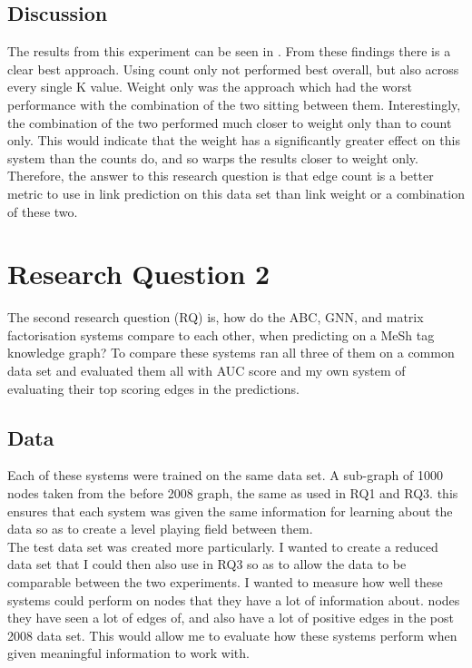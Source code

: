 \documentclass{l4proj}
\begin{document}
\subsection{Discussion}

The results from this experiment can be seen in . From these findings there is a clear best approach. Using count only not performed best overall, but also across every single K value. Weight only was the approach which had the worst performance with the combination of the two sitting between them. Interestingly, the combination of the two performed much closer to weight only than to count only. This would indicate that the weight has a significantly greater effect on this system than the counts do, and so warps the results closer to weight only. \\ 

Therefore, the answer to this research question is that edge count is a better metric to use in link prediction on this data set than link weight or a combination of these two. \\

\section{Research Question 2}

The second research question (RQ) is, how do the ABC, GNN, and matrix factorisation systems compare to each other, when predicting on a MeSh tag knowledge graph? To compare these systems ran all three of them on a common data set and evaluated them all with AUC score and my own system of evaluating their top scoring edges in the predictions. \\

\subsection{Data}

Each of these systems were trained on the same data set. A sub-graph of 1000 nodes taken from the before 2008 graph, the same as used in RQ1 and RQ3. this ensures that each system was given the same information for learning about the data so as to create a level playing field between them. \\

The test data set was created more particularly. I wanted to create a reduced data set that I could then also use in RQ3 so as to allow the data to be comparable between the two experiments. I wanted to measure how well these systems could perform on nodes that they have a lot of information about. nodes they have seen a lot of edges of, and also have a lot of positive edges in the post 2008 data set. This would allow me to evaluate how these systems perform when given meaningful information to work with. \\
\end{document}
